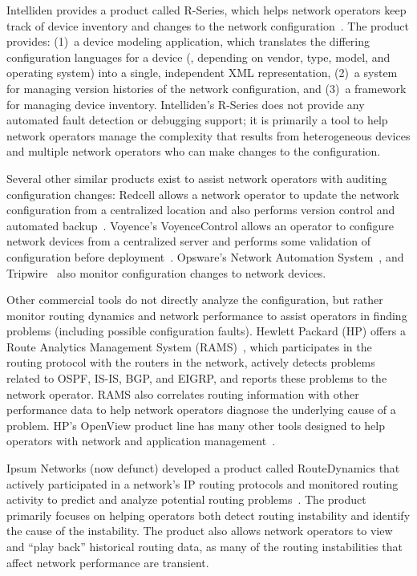 Intelliden provides a product called R-Series, which helps network
operators keep track of device inventory and changes to the network
configuration~\cite{www-intelliden}. The product provides: (1)~a device
modeling application, which translates the differing configuration
languages for a device (\ie, depending on vendor, type, model, and
operating system) into a single, independent XML representation, (2)~a
system for managing version histories of the network configuration,
and (3)~a framework for managing device inventory.  Intelliden's R-Series
does not provide any automated fault detection or
debugging support; it is primarily a tool to help network operators
manage the complexity that results from heterogeneous devices and
multiple network operators who can make changes to the configuration.

Several other similar products exist to assist network operators with
auditing configuration changes: Redcell allows a network operator to
update the network configuration from a centralized location and also
performs version control and automated backup~\cite{www-redcell}.
Voyence's VoyenceControl allows an operator to configure network devices
from a centralized server and performs some validation of configuration
before deployment~\cite{www-voyencecontrol}.  Opsware's Network
Automation System~\cite{www-opsware}, and Tripwire~\cite{www-tripwire}
also monitor configuration changes to
network devices.

Other commercial tools do not directly analyze the configuration, but
rather monitor routing dynamics and network performance to assist
operators in finding problems (including possible configuration
faults).  Hewlett Packard (HP) offers a Route Analytics Management
System (RAMS)~\cite{www-hp-rams}, which 
participates in the routing protocol with the routers in the network,
actively detects problems related to OSPF, IS-IS, BGP, and EIGRP, and
reports these problems to the network operator.  RAMS also
correlates routing information with other performance data to help
network operators diagnose the underlying cause of a problem.
HP's OpenView product line has many other tools designed to help
operators with network and application management~\cite{www-hp-openview}.

Ipsum Networks (now defunct) developed a product called RouteDynamics
that actively participated in a network's 
IP routing protocols and monitored routing activity to predict and
analyze potential routing problems~\cite{www-ipsumnetworks}.  The
product primarily focuses on helping operators both detect routing
instability and identify the cause of the instability.  The product also
allows network operators to view and ``play back'' historical routing
data, as many of the routing instabilities that affect network
performance are transient.

